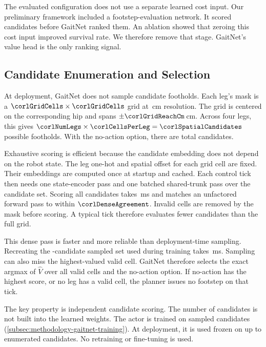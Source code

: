 The evaluated configuration does not use a separate learned cost
input. Our preliminary framework \cite{Sullivan2025} included a
footstep-evaluation network. It scored candidates before GaitNet
ranked them. An ablation showed that zeroing this cost input improved
survival rate. We therefore remove that stage. GaitNet's value head is
the only ranking signal.

\begin{changedblock}
\subsection{Candidate Enumeration and Selection}
\label{subsec:methodology-gaitnet-selection}

At deployment, GaitNet does not sample candidate footholds. Each leg's
mask is a $\corlGridCells \times \corlGridCells$ grid at
\corlMaskResolutionCm\,cm resolution. The grid is centered on the
corresponding hip and spans $\pm\corlGridReachCm$\,cm. Across four
legs, this gives $\corlNumLegs \times \corlCellsPerLeg =
\corlSpatialCandidates$ possible footholds. With the no-action option,
there are \corlTotalCandidatesDense{} total candidates.

Exhaustive scoring is efficient because the candidate embedding does
not depend on the robot state. The leg one-hot and spatial offset for
each grid cell are fixed. Their embeddings are computed once at
startup and cached. Each control tick then needs one state-encoder
pass and one batched shared-trunk pass over the candidate set. Scoring
all \corlTotalCandidatesDense{} candidates takes \corlDenseScoreMs\,ms
and matches an unfactored forward pass to within
$\corlDenseAgreement$. Invalid cells are removed by the mask before
scoring. A typical tick therefore evaluates fewer candidates than the
full grid.

This dense pass is faster and more reliable than deployment-time
sampling. Recreating the \corlTrainTotalCandidates{}-candidate sampled
set used during training takes \corlSampledScoreMs\,ms. Sampling can
also miss the highest-valued valid cell. GaitNet therefore selects the
exact argmax of $\hat{V}$ over all valid cells and the no-action
option. If no-action has the highest score, or no leg has a valid
cell, the planner issues no footstep on that tick.

The key property is independent candidate scoring. The number of
candidates is not built into the learned weights. The actor is trained
on \corlTrainTotalCandidates{} sampled candidates
(\autoref{subsec:methodology-gaitnet-training}). At deployment, it is
used frozen on up to \corlTotalCandidatesDense{} enumerated
candidates. No retraining or fine-tuning is used.
\end{changedblock}

